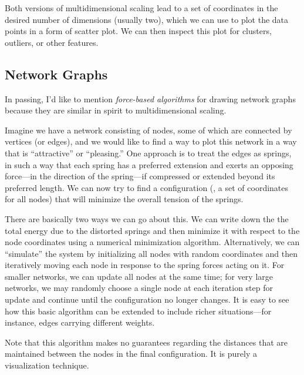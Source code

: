 Both versions of multidimensional scaling lead to a set of coordinates
in the desired number of dimensions (usually two), which we can use to
plot the data points in a form of scatter plot. We can then inspect
this plot for clusters, outliers, or other features.

\vspace*{-6pt}
\subsection{Network Graphs}

 
In passing, I'd like to mention \emph{force-based algorithms}
 for drawing network graphs because they
are similar in spirit to multidimensional scaling.

Imagine we have a network consisting of nodes, some of which are
connected by vertices (or edges), and we would like to find a way to
plot this network in a way that is ``attractive'' or ``pleasing.''
One approach is to treat the edges as springs, in such a way that each
spring has a preferred extension and exerts an opposing force---in the
direction of the spring---if compressed or extended beyond its
preferred length. We can now try to find a configuration (\ie, a set
of coordinates for all nodes) that will minimize the overall tension
of the springs.

There are basically two ways we can go about this. We can write down
the the total energy due to the distorted springs and then minimize it
with respect to the node coordinates using a numerical minimization
algorithm. Alternatively, we can ``simulate'' the system by
initializing all nodes with random coordinates and then iteratively
moving each node in response to the spring forces acting on it. For
smaller networks, we can update all nodes at the same time; for very
large networks, we may randomly choose a single node at each iteration
step for update and continue until the configuration no longer
changes. It is easy to see how this basic algorithm can be extended
to include richer situations---for instance, edges carrying different
weights.

Note that this algorithm makes no guarantees regarding the distances
that are maintained between the nodes in the final configuration. It
is purely a visualization technique.

\vspace*{-6pt}
